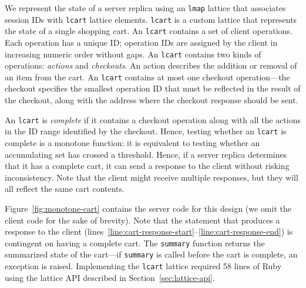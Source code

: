 
We represent the state of a server replica using an \texttt{lmap} lattice that
associates session IDs with \texttt{lcart} lattice elements. \texttt{lcart} is a
custom lattice that represents the state of a single shopping cart. An
\texttt{lcart} contains a set of client operations. Each operation has a unique
ID; operation IDs are assigned by the client in increasing numeric order without
gaps. An \texttt{lcart} contains two kinds of operations: \emph{actions} and
\emph{checkouts}. An action describes the addition or removal of an item from
the cart. An \texttt{lcart} contains at most one checkout operation---the
checkout specifies the smallest operation ID that must be reflected in the
result of the checkout, along with the address where the checkout response
should be sent.

An \texttt{lcart} is \emph{complete} if it contains a checkout operation along
with all the actions in the ID range identified by the checkout. Hence, testing
whether an \texttt{lcart} is complete is a monotone function: it is equivalent
to testing whether an accumulating set has crossed a threshold. Hence, if a
server replica determines that it has a complete cart, it can send a response to
the client without risking inconsistency. Note that the client might receive
multiple responses, but they will all reflect the same cart contents.

Figure~\ref{fig:monotone-cart} contains the server code for this design (we omit
the client code for the sake of brevity). Note that the statement that produces
a response to the client
(lines~\ref{line:cart-response-start}--\ref{line:cart-response-end}) is
contingent on having a complete cart. The \texttt{summary} function returns the
summarized state of the cart---if \texttt{summary} is called before the cart is
complete, an exception is raised. Implementing the \texttt{lcart} lattice
required 58 lines of Ruby using the lattice API described in
Section~\ref{sec:lattice-api}.

